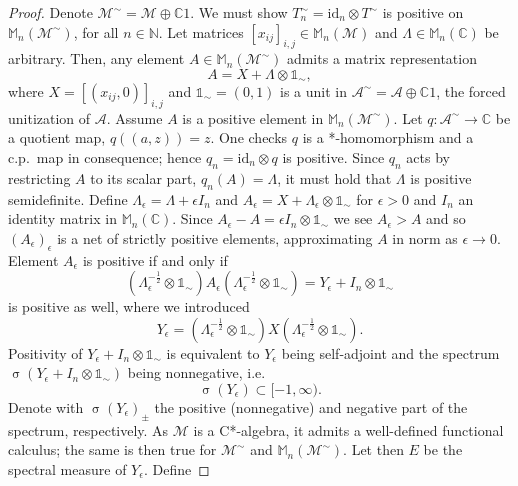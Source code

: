 \documentclass[10pt,a4paper]{amsart}
\newcommand{\complexes}{\mathbb{C}}
\newcommand{\id}[1]{\mathrm{id}_{#1}}
\newcommand{\matr}[1]{\mathbb{M}_{#1}(\complexes)}
\newcommand{\matra}[2]{\mathbb{M}_{#1}(#2)}
\newcommand{\naturals}{\mathbb{N}}
\newcommand{\spec}[1]{\operatorname{\sigma}{\left(#1\right)}}
\newcommand{\unit}{\mathds{1}}
\begin{document}
\begin{proof}
    Denote $\mathscr{M}^\sim = \mathscr{M}\oplus\complexes 1$. We must show $T_{n}^{\sim} = \id{n}\otimes T^\sim$ is positive on $\matra{n}{\mathscr{M}^\sim}$, for all $n\in\naturals$. Let matrices $\left[x_{ij}\right]_{i,j} \in \matra{n}{\mathscr{M}}$ and $\Lambda \in \matr{n}$ be arbitrary. Then, any element $A \in \matra{n}{\mathscr{M}^\sim}$ admits a matrix representation
    \begin{equation}
        A = X + \Lambda \otimes \unit_\sim ,
    \end{equation}
    where $X = \left[(x_{ij},0)\right]_{i,j}$ and $\unit_\sim = (0,1)$ is a unit in $\mathscr{A}^\sim = \mathscr{A}\oplus \complexes 1$, the forced unitization of $\mathscr{A}$. Assume $A$ is a positive element in $\matra{n}{\mathscr{M}^\sim}$. Let $q : \mathscr{A}^\sim \to \complexes$ be a quotient map, $q ((a,z)) = z$. One checks $q$ is a *-homomorphism and a c.p.~map in consequence; hence $q_n = \id{n}\otimes q$ is positive. Since $q_n$ acts by restricting $A$ to its scalar part, $q_n (A) = \Lambda$, it must hold that $\Lambda$ is positive semidefinite. Define $\Lambda_\epsilon = \Lambda + \epsilon I_n$ and $A_\epsilon = X + \Lambda_\epsilon \otimes \unit_\sim$ for $\epsilon > 0$ and $I_n$ an identity matrix in $\matr{n}$. Since $A_\epsilon - A = \epsilon I_n \otimes \unit_\sim$ we see $A_\epsilon > A$ and so $\left(A_\epsilon\right)_\epsilon$ is a net of strictly positive elements, approximating $A$ in norm as $\epsilon \to 0$. Element $A_\epsilon$ is positive if and only if
    \begin{equation}
        (\Lambda_{\epsilon}^{-\frac{1}{2}}\otimes \unit_\sim)A_\epsilon (\Lambda_{\epsilon}^{-\frac{1}{2}}\otimes \unit_\sim) = Y_\epsilon + I_n \otimes \unit_\sim
    \end{equation}
    is positive as well, where we introduced
    \begin{equation}
        Y_\epsilon = (\Lambda_{\epsilon}^{-\frac{1}{2}}\otimes \unit_\sim)X (\Lambda_{\epsilon}^{-\frac{1}{2}}\otimes \unit_\sim).
    \end{equation}
    Positivity of $Y_\epsilon + I_n \otimes \unit_\sim$ is equivalent to $Y_\epsilon$ being self-adjoint and the spectrum $\spec{Y_\epsilon + I_n \otimes \unit_\sim}$ being nonnegative, i.e.
    \begin{equation}
        \spec{Y_\epsilon} \subset [-1,\infty ).
    \end{equation}
    Denote with $\spec{Y_\epsilon}_\pm$ the positive (nonnegative) and negative part of the spectrum, respectively. As $\mathscr{M}$ is a C*-algebra, it admits a well-defined functional calculus; the same is then true for $\mathscr{M}^\sim$ and $\matra{n}{\mathscr{M}^\sim}$. Let then $E$ be the spectral measure of $Y_\epsilon$. Define

\end{proof}
\end{document}

